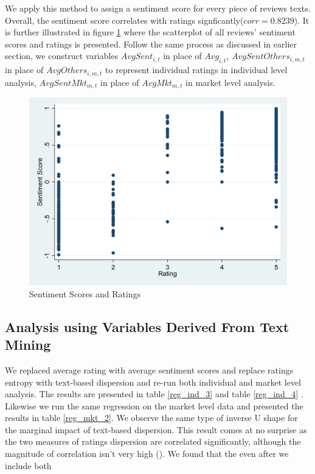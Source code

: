 \documentclass[msom,blindrev]{informs3}
\begin{document}
We apply this method to assign a sentiment score for every piece of reviews texts. Overall, the sentiment score correlates with ratings signficantly($corr = 0.8239$). It is further illustrated in figure \ref{sent_score_scatter} where the scatterplot of all reviews' sentiment scores and ratings is presented.  Follow the same process as discussed in earlier section, we construct variables $AvgSent_{i,t}$ in place of $Avg_{i,t}$, $AvgSentOthers_{i,m,t}$ in place of $AvgOthers_{i,m,t}$ to represent individual ratings in individual level analysis, $AvgSentMkt_{m,t}$ in place of $AvgMkt_{m,t}$ in market level analysis.
\begin{figure}
	\centering
	\includegraphics[width=0.7\linewidth]{sent_score_scatter.png}
	\caption{Sentiment Scores and Ratings}
	\label{sent_score_scatter}
\end{figure}

\subsection{Analysis using Variables Derived From Text Mining}


We replaced average rating with average sentiment scores and replace ratings entropy with text-based dispersion and re-run both individual and market level analysis. The results are presented in table \ref{reg_ind_3} and table \ref{reg_ind_4} . Likewise we run the same regression on the market level data and presented the results in table \ref{reg_mkt_2}. We observe the same type of inverse U shape for the marginal impact of text-based dispersion. This result comes at no surprise as the two measures of ratings dispersion are correlated significantly, although the magnitude of correlation isn't very high ().  We found that the even after we include both  \\
\end{document}
